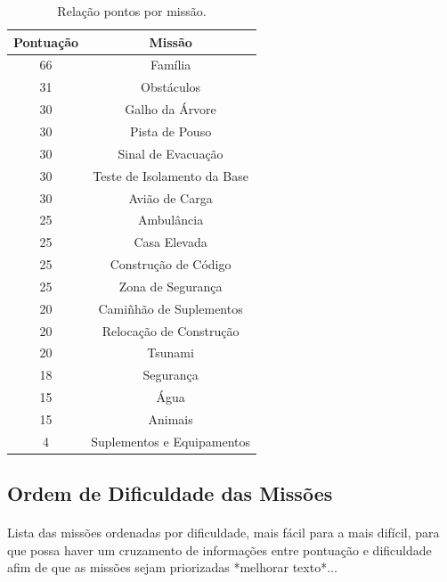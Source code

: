 \documentclass{article}
\begin{document}
		\begin{table}[h!]
			\begin{center}
				\begin{tabular}{c|c}
					Pontuação & Missão\\
					\hline
					66 & Família\\
					\hline
					31 & Obstáculos\\
					\hline
					30 & Galho da Árvore\\
					\hline
					30 & Pista de Pouso\\
					\hline
					30 & Sinal de Evacuação\\
					\hline
					30 & Teste de Isolamento da Base\\
					\hline
					30 & Avião de Carga\\
					\hline
					25 & Ambulância\\
					\hline
					25 & Casa Elevada\\
					\hline
					25 & Construção de Código\\
					\hline
					25 & Zona de Segurança\\
					\hline
					20 & Camiñhão de Suplementos\\
					\hline
					20 & Relocação de Construção\\
					\hline
					20 & Tsunami\\
					\hline
					18 & Segurança\\
					\hline
					15 & Água\\
					\hline
					15 & Animais\\
					\hline
					4 & Suplementos e Equipamentos\\
				\end{tabular}
				\caption{Relação pontos por missão.}
				\label{tab:table_pontuation}
			\end{center}
		\end{table}

	\subsection{Ordem de Dificuldade das Missões}
		\paragraph{}
			Lista das missões ordenadas por dificuldade, mais fácil para a mais difícil, para que possa haver um cruzamento de informações entre pontuação e dificuldade afim de que as missões sejam priorizadas *melhorar texto*...
\end{document}
